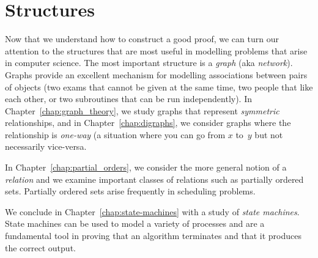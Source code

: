 \part{Structures}
\label{part:structures}

Now that we understand how to construct a good proof, we can turn our
attention to the structures that are most useful in modelling problems
that arise in computer science.  The most important structure is a
\emph{graph} (aka \emph{network}).  Graphs provide an excellent
mechanism for modelling associations between pairs of objects (\eg two
exams that cannot be given at the same time, two people that like each
other, or two subroutines that can be run independently).  In
Chapter~\ref{chap:graph_theory}, we study graphs that represent
\emph{symmetric} relationships, and in Chapter~\ref{chap:digraphs}, we
consider graphs where the relationship is \emph{one-way} (\eg a
situation where you can go from $x$ to~$y$ but not necessarily
vice-versa.

In Chapter~\ref{chap:partial_orders}, we consider the more general
notion of a \emph{relation} and we examine important classes of
relations such as partially ordered sets.  Partially ordered sets
arise frequently in scheduling problems.

We conclude in Chapter~\ref{chap:state-machines} with a study of
\emph{state machines}.  State machines can be used to model a variety
of processes and are a fundamental tool in proving that an algorithm
terminates and that it produces the correct output.

\endinput
